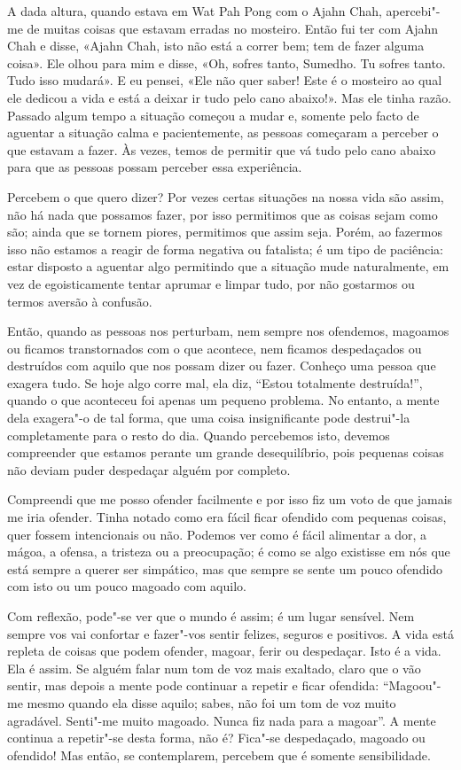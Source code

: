 A dada altura, quando estava em Wat Pah Pong com o Ajahn Chah, apercebi"-me de
muitas coisas que estavam erradas no mosteiro. Então fui ter com Ajahn Chah e disse,
«Ajahn Chah, isto não está a correr bem; tem de fazer alguma coisa». Ele olhou
para mim e disse, «Oh, sofres tanto, Sumedho. Tu sofres tanto. Tudo isso
mudará». E eu pensei, «Ele não quer saber! Este é o mosteiro ao qual ele dedicou
a vida e está a deixar ir tudo pelo cano abaixo!». Mas ele tinha razão. Passado
algum tempo a situação começou a mudar e, somente pelo facto de aguentar a
situação calma e pacientemente, as pessoas começaram a perceber o que estavam a
fazer. Às vezes, temos de permitir que vá tudo pelo cano abaixo para que as
pessoas possam perceber essa experiência.

Percebem o que quero dizer? Por vezes certas situações na nossa vida são assim,
não há nada que possamos fazer, por isso permitimos que as coisas sejam como são;
ainda que se tornem piores, permitimos que assim seja. Porém, ao fazermos isso
não estamos a reagir de forma negativa ou fatalista; é um tipo de paciência:
estar disposto a aguentar algo permitindo que a situação mude naturalmente, em
vez de egoisticamente tentar aprumar e limpar tudo, por não gostarmos ou termos
aversão à confusão.

Então, quando as pessoas nos perturbam, nem sempre nos ofendemos, magoamos ou
ficamos transtornados com o que acontece, nem ficamos despedaçados ou destruídos
com aquilo que nos possam dizer ou fazer. Conheço uma pessoa que exagera tudo.
Se hoje algo corre mal, ela diz, “Estou totalmente destruída!”, quando o que
aconteceu foi apenas um pequeno problema. No entanto, a mente dela exagera"-o de
tal forma, que uma coisa insignificante pode destrui"-la completamente para o resto
do dia. Quando percebemos isto, devemos compreender que estamos perante um
grande desequilíbrio, pois pequenas coisas não deviam puder despedaçar alguém por
completo.

Compreendi que me posso ofender facilmente e por isso fiz um voto de que jamais
me iria ofender. Tinha notado como era fácil ficar ofendido com pequenas
coisas, quer fossem intencionais ou não. Podemos ver como é fácil alimentar a dor,
a mágoa, a ofensa, a tristeza ou a preocupação; é como se algo existisse em nós
que está sempre a querer ser simpático, mas que sempre se sente um pouco
ofendido com isto ou um pouco magoado com aquilo.

Com reflexão, pode"-se ver que o mundo é assim; é um lugar sensível. Nem sempre
vos vai confortar e fazer"-vos sentir felizes, seguros e positivos. A vida está
repleta de coisas que podem ofender, magoar, ferir ou despedaçar. Isto é a vida.
Ela é assim. Se alguém falar num tom de voz mais exaltado, claro que o vão
sentir, mas depois a mente pode continuar a repetir e ficar ofendida: “Magoou"-me
mesmo quando ela disse aquilo; sabes, não foi um tom de voz muito agradável.
Senti"-me muito magoado. Nunca fiz nada para a magoar”. A mente continua a
repetir"-se desta forma, não é? Fica"-se despedaçado, magoado ou ofendido! Mas
então, se contemplarem, percebem que é somente sensibilidade.

